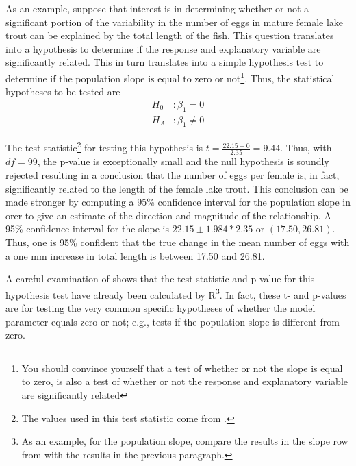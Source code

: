 \documentclass[10pt,openany]{book}\usepackage[]{graphicx}\usepackage[]{color}
\begin{document}

As an example, suppose that interest is in determining whether or not a significant portion of the variability in the number of eggs in mature female lake trout can be explained by the total length of the fish.  This question translates into a hypothesis to determine if the response and explanatory variable are significantly related.  This in turn translates into a simple hypothesis test to determine if the population slope is equal to zero or not\footnote{You should convince yourself that a test of whether or not the slope is equal to zero, is also a test of whether or not the response and explanatory variable are significantly related}.  Thus, the statistical hypotheses to be tested are
\[ \begin{split}
H_{0}&: \beta_{1} = 0 \\
H_{A}&: \beta_{1} \neq 0
\end{split} \]

The test statistic\footnote{The values used in this test statistic come from .} for testing this hypothesis is $t=\frac{22.15-0}{2.35}=9.44$.  Thus, with $df=99$, the p-value is exceptionally small and the null hypothesis is soundly rejected resulting in a conclusion that the number of eggs per female is, in fact, significantly related to the length of the female lake trout.  This conclusion can be made stronger by computing a 95\% confidence interval for the population slope in orer to give an estimate of the direction and magnitude of the relationship.  A 95\% confidence interval for the slope is $22.15\pm1.984*2.35$ or $(17.50, 26.81)$.  Thus, one is 95\% confident that the true change in the mean number of eggs with a one mm increase in total length is between 17.50 and 26.81.

A careful examination of  shows that the test statistic and p-value for this hypothesis test have already been calculated by R\footnote{As an example, for the population slope, compare the results in the slope row from  with the results in the previous paragraph.}.  In fact, these t- and p-values are for testing the very common specific hypotheses of whether the model parameter equals zero or not; e.g., tests if the population slope is different from zero.
\end{document}
